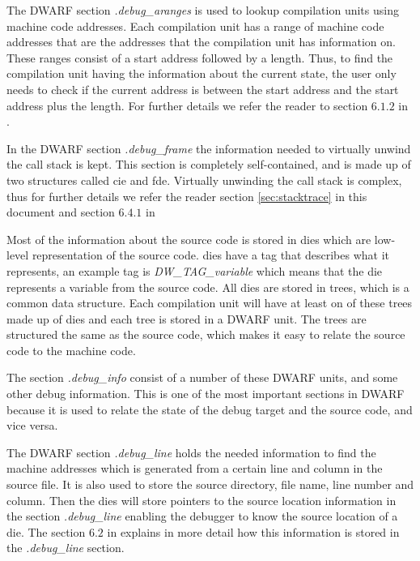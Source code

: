 The \gls{DWARF} section \emph{.debug\_aranges} is used to lookup compilation units using machine code addresses.
Each compilation unit has a range of machine code addresses that are the addresses that the compilation unit has information on.
These ranges consist of a start address followed by a length.
Thus, to find the compilation unit having the information about the current state, the user only needs to check if the current address is between the start address and the start address plus the length.
For further details we refer the reader to section $6.1.2$ in \cite{dwarf}.


In the \gls{DWARF} section \emph{.debug\_frame} the information needed to virtually unwind the call stack is kept.
This section is completely self-contained, and is made up of two structures called \acrfull{cie} and \acrfull{fde}.
Virtually unwinding the call stack is complex, thus for further details we refer the reader section \ref{sec:stacktrace} in this document and section $6.4.1$ in \cite{dwarf}


Most of the information about the source code is stored in \glspl{die} which are low-level representation of the source code.
\glspl{die} have a tag that describes what it represents, an example tag is \emph{DW\_TAG\_variable} which means that the \gls{die} represents a variable from the source code.
All \glspl{die} are stored in trees, which is a common data structure.
Each compilation unit will have at least on of these trees made up of \glspl{die} and each tree is stored in a \gls{DWARF} unit.
The trees are structured the same as the source code, which makes it easy to relate the source code to the machine code.

The section \emph{.debug\_info} consist of a number of these \gls{DWARF} units, and some other debug information.
This is one of the most important sections in \gls{DWARF} because it is used to relate the state of the debug target and the source code, and vice versa.


The \gls{DWARF} section \emph{.debug\_line} holds the needed information to find the machine addresses which is generated from a certain line and column in the source file.
It is also used to store the source directory, file name, line number and column.
Then the \glspl{die} will store pointers to the source location information in the section \emph{.debug\_line} enabling the debugger to know the source location of a \gls{die}.
The section $6.2$ in \cite{dwarf} explains in more detail how this information is stored in the \emph{.debug\_line} section.


